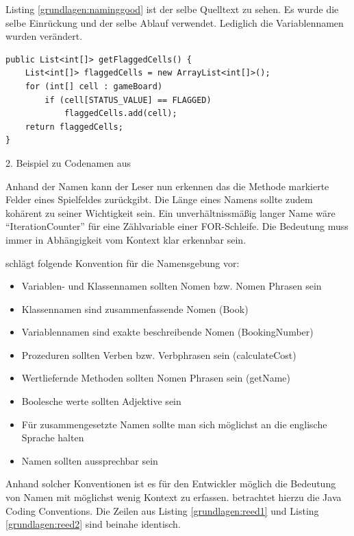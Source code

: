 Listing \ref{grundlagen:naminggood} ist der selbe Quelltext zu sehen.
Es wurde die selbe Einrückung und der selbe Ablauf verwendet. Lediglich
die Variablennamen wurden verändert.

\begin{listing}
    \begin{verbatim}
public List<int[]> getFlaggedCells() {
    List<int[]> flaggedCells = new ArrayList<int[]>();
    for (int[] cell : gameBoard)
        if (cell[STATUS_VALUE] == FLAGGED)
            flaggedCells.add(cell);
    return flaggedCells;
}
    \end{verbatim}
    \caption{2. Beispiel zu Codenamen aus \cite[S. 47]{Martin}}
    \label{grundlagen:naminggood}
\end{listing}

Anhand der Namen kann der Leser nun erkennen das die Methode markierte Felder eines Spielfeldes zurückgibt.
Die Länge eines Namens sollte zudem kohärent zu seiner Wichtigkeit sein.
Ein unverhältnissmäßig langer Name wäre \enquote{IterationCounter} für eine Zählvariable einer FOR-Schleife.
Die Bedeutung muss immer in Abhängigkeit vom Kontext klar erkennbar sein.

\cite[S. 4]{Green} schlägt folgende Konvention für die Namensgebung vor:
\begin{itemize}
	\item Variablen- und Klassennamen sollten Nomen bzw. Nomen Phrasen sein
	\item Klassennamen sind zusammenfassende Nomen (Book)
	\item Variablennamen sind exakte beschreibende Nomen (BookingNumber)
	\item Prozeduren sollten Verben bzw. Verbphrasen sein (calculateCost)
	\item Wertliefernde Methoden sollten Nomen Phrasen sein (getName) 
	\item Boolesche werte sollten Adjektive sein
	\item Für zusammengesetzte Namen sollte man sich möglichst an die englische Sprache halten
	\item Namen sollten aussprechbar sein
\end{itemize}

Anhand solcher Konventionen ist es für den Entwickler möglich die Bedeutung von Namen mit möglichst wenig Kontext zu erfassen.
\cite{reed} betrachtet hierzu die Java Coding Conventions. Die Zeilen aus Listing \ref{grundlagen:reed1} und
Listing \ref{grundlagen:reed2} sind beinahe identisch. 

